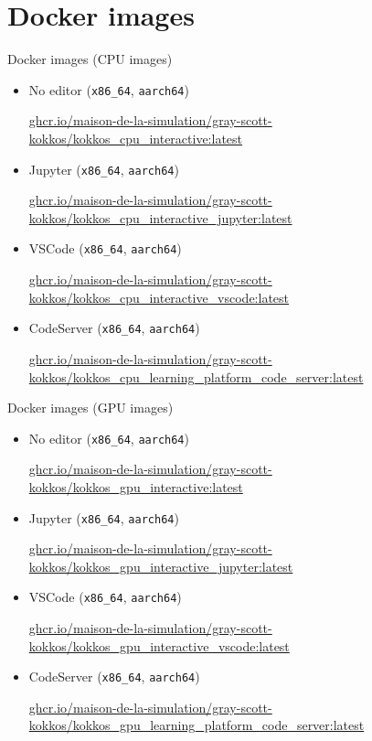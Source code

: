\documentclass[
    aspectratio=169,
]{beamer}
\begin{document}
\section{Docker images}

\begin{frame}{Docker images (CPU images)}
    \begin{itemize}
        \item No editor (\texttt{x86\_64}, \texttt{aarch64})

        {\tiny \url{ghcr.io/maison-de-la-simulation/gray-scott-kokkos/kokkos_cpu_interactive:latest}}
        \item Jupyter (\texttt{x86\_64}, \texttt{aarch64})

        {\tiny \url{ghcr.io/maison-de-la-simulation/gray-scott-kokkos/kokkos_cpu_interactive_jupyter:latest}}
        \item VSCode (\texttt{x86\_64}, \texttt{aarch64})

        {\tiny \url{ghcr.io/maison-de-la-simulation/gray-scott-kokkos/kokkos_cpu_interactive_vscode:latest}}
        \item CodeServer (\texttt{x86\_64}, \texttt{aarch64})

        {\tiny \url{ghcr.io/maison-de-la-simulation/gray-scott-kokkos/kokkos_cpu_learning_platform_code_server:latest}}
    \end{itemize}
\end{frame}

\begin{frame}{Docker images (GPU images)}
    \begin{itemize}
        \item No editor (\texttt{x86\_64}, \texttt{aarch64})

        {\tiny \url{ghcr.io/maison-de-la-simulation/gray-scott-kokkos/kokkos_gpu_interactive:latest}}
        \item Jupyter (\texttt{x86\_64}, \texttt{aarch64})

        {\tiny \url{ghcr.io/maison-de-la-simulation/gray-scott-kokkos/kokkos_gpu_interactive_jupyter:latest}}
        \item VSCode (\texttt{x86\_64}, \texttt{aarch64})

        {\tiny \url{ghcr.io/maison-de-la-simulation/gray-scott-kokkos/kokkos_gpu_interactive_vscode:latest}}
        \item CodeServer (\texttt{x86\_64}, \texttt{aarch64})

        {\tiny \url{ghcr.io/maison-de-la-simulation/gray-scott-kokkos/kokkos_gpu_learning_platform_code_server:latest}}
    \end{itemize}
\end{frame}
\end{document}
